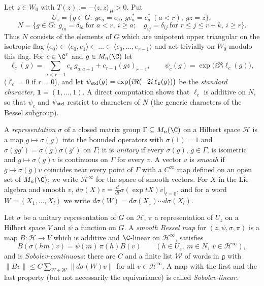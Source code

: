Let $z\in W_0$ with $T(z):=-\langle z,z\rangle_H>0$. Put
\[
U_z=\{g\in G:\ ge_a=e_a,\ ge_a^*=e_a^*\ (a<r),\ gz=z\},
\]
\[
N=\{g\in G:\ g_{ia}=\delta_{ia}\ \text{for }a<r,\ i\ge a;\quad g_{ij}=\delta_{ij}\ \text{for }r\le j\le r+k,\ i\ge r\}.
\]
Thus $N$ consists of the elements of $G$ which are unipotent upper triangular on the isotropic flag
$\langle e_0\rangle\subset\langle e_0,e_1\rangle\subset\dots\subset\langle e_0,\dots,e_{r-1}\rangle$ and act
trivially on $W_0$ modulo this flag. For $c\in\C^r$ and $g\in M_n(\C)$ let
\[
\ell_c(g)=\sum_{a<r-1}c_a\,g_{a,a+1}+c_{r-1}(gz)_{r-1},\qquad \psi_c(g)=\exp\bigl(i\Re\ell_c(g)\bigr),
\]
($\ell_c=0$ if $r=0$), and let $\psi_{\mathrm{std}}(g)=\exp\bigl(i\Re(-2i\,\ell_{\mathbf 1}(g))\bigr)$ be the
\emph{standard character}, $\mathbf 1=(1,\dots,1)$. A direct computation shows that $\ell_c$ is additive on $N$, so that
$\psi_c$ and $\psi_{\mathrm{std}}$ restrict to characters of $N$ (the generic characters of the Bessel subgroup).

A \emph{representation} $\sigma$ of a closed matrix group $\Gamma\subseteq M_n(\C)$ on a Hilbert space
$\mathcal H$ is a map $g\mapsto\sigma(g)$ into the bounded operators with $\sigma(1)=1$ and
$\sigma(gg')=\sigma(g)\sigma(g')$ on $\Gamma$; it is \emph{unitary} if every $\sigma(g)$, $g\in\Gamma$, is
isometric and $g\mapsto\sigma(g)v$ is continuous on $\Gamma$ for every $v$. A vector $v$ is \emph{smooth} if
$g\mapsto\sigma(g)v$ coincides near every point of $\Gamma$ with a $C^\infty$ map defined on an open set of
$M_n(\C)$; we write $\mathcal H^\infty$ for the space of smooth vectors. For $X$ in the Lie algebra and smooth
$v$, $d\sigma(X)v=\frac{d}{dt}\sigma(\exp tX)v|_{t=0}$, and for a word $W=(X_1,\dots,X_l)$ we write
$d\sigma(W)=d\sigma(X_1)\cdots d\sigma(X_l)$.

\begin{definition}\label{pf:sh-local:def:bessel}
Let $\sigma$ be a unitary representation of $G$ on $\mathcal H$, $\pi$ a representation of $U_z$ on a Hilbert
space $V$ and $\psi$ a function on $G$. A \emph{smooth Bessel map} for $(z,\psi,\sigma,\pi)$ is a map
$B:\mathcal H\to V$ which is additive and $\C$-linear on $\mathcal H^\infty$, satisfies
\[
B(\sigma(hm)v)=\psi(m)\,\pi(h)B(v)\qquad(h\in U_z,\ m\in N,\ v\in\mathcal H^\infty),
\]
and is \emph{Sobolev-continuous}: there are $C$ and a finite list $\mathcal W$ of words in $\mathfrak g$ with
$\|Bv\|\le C\sum_{W\in\mathcal W}\|d\sigma(W)v\|$ for all $v\in\mathcal H^\infty$. A map with the first and the
last property (but not necessarily the equivariance) is called \emph{Sobolev-linear}.
\end{definition}

